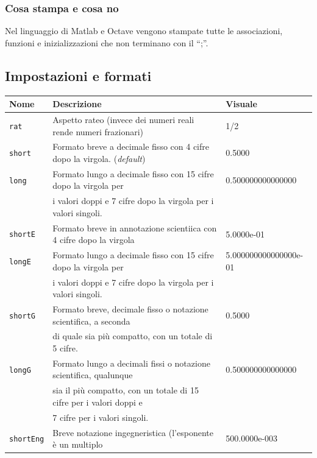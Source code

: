 \subsubsection{Cosa stampa e cosa no}
Nel linguaggio di Matlab e Octave vengono stampate tutte le associazioni,
funzioni e inizializzazioni che non terminano con il ``{\color{red};}''.

\subsection{Impostazioni e formati}
\label{sec:formImp}
\begin{table}[ht]
  \centering
  \begin{tabular}{lll}
    {\bf Nome} & {\bf Descrizione} & {\bf Visuale}\\\hline
    \lstinline|rat| & Aspetto rateo (invece dei numeri reali rende numeri frazionari) & 1/2\\\hline
    \lstinline|short| & Formato breve a decimale fisso con 4 cifre dopo la virgola. (\textit{default}) & 0.5000\\\hline
    \lstinline|long| & Formato lungo a decimale fisso con 15 cifre dopo la virgola per & 0.500000000000000\\
                     &  i valori doppi e 7 cifre dopo la virgola per i valori singoli. \\\hline
    \lstinline|shortE| & Formato breve in annotazione scientiica con 4 cifre dopo la virgola & 5.0000e-01\\\hline
    \lstinline|longE| & Formato lungo a decimale fisso con 15 cifre dopo la virgola per & 5.000000000000000e-01\\
               & i valori doppi e 7 cifre dopo la virgola per i valori singoli.\\\hline
    \lstinline|shortG| & Formato breve, decimale fisso o notazione scientifica, a seconda & 0.5000\\
               & di quale sia più compatto, con un totale di 5 cifre.\\\hline
    \lstinline|longG| & Formato lungo a decimali fissi o notazione scientifica, qualunque & 0.500000000000000\\
               & sia il più compatto, con un totale di 15 cifre per i valori doppi e\\ & 7 cifre per i valori singoli.\\\hline
    \lstinline|shortEng| & Breve notazione ingegneristica (l'esponente è un
                           multiplo & 500.0000e-003\\
    

\end{tabular}
\end{table}
